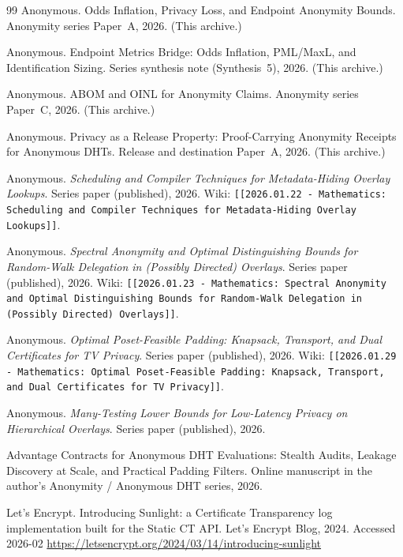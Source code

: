 \documentclass[11pt]{article}
\begin{document}
\begin{thebibliography}{99}
Anonymous.
\newblock Odds Inflation, Privacy Loss, and Endpoint Anonymity Bounds.
\newblock Anonymity series Paper~A, 2026. (This archive.)

Anonymous.
\newblock Endpoint Metrics Bridge: Odds Inflation, PML/MaxL, and Identification Sizing.
\newblock Series synthesis note (Synthesis~5), 2026. (This archive.)

Anonymous.
\newblock ABOM and OINL for Anonymity Claims.
\newblock Anonymity series Paper~C, 2026. (This archive.)

Anonymous.
\newblock Privacy as a Release Property: Proof-Carrying Anonymity Receipts for Anonymous DHTs.
\newblock Release and destination Paper~A, 2026. (This archive.)

Anonymous.
\newblock \emph{Scheduling and Compiler Techniques for Metadata-Hiding Overlay Lookups}.
\newblock Series paper (published), 2026.
\newblock Wiki: \texttt{[[2026.01.22 - Mathematics: Scheduling and Compiler Techniques for Metadata-Hiding Overlay Lookups]]}.

Anonymous.
\newblock \emph{Spectral Anonymity and Optimal Distinguishing Bounds for Random-Walk Delegation in (Possibly Directed) Overlays}.
\newblock Series paper (published), 2026.
\newblock Wiki: \texttt{[[2026.01.23 - Mathematics: Spectral Anonymity and Optimal Distinguishing Bounds for Random-Walk Delegation in (Possibly Directed) Overlays]]}.

Anonymous.
\newblock \emph{Optimal Poset-Feasible Padding: Knapsack, Transport, and Dual Certificates for TV Privacy}.
\newblock Series paper (published), 2026.
\newblock Wiki: \texttt{[[2026.01.29 - Mathematics: Optimal Poset-Feasible Padding: Knapsack, Transport, and Dual Certificates for TV Privacy]]}.

Anonymous.
\newblock \emph{Many-Testing Lower Bounds for Low-Latency Privacy on Hierarchical Overlays}.
\newblock Series paper (published), 2026.

\newblock Advantage Contracts for Anonymous DHT Evaluations: Stealth Audits, Leakage Discovery at Scale, and Practical Padding Filters.
\newblock Online manuscript in the author's Anonymity / Anonymous DHT series, 2026.

{Let's Encrypt}.
\newblock Introducing Sunlight: a Certificate Transparency log implementation built for the Static CT API.
\newblock Let's Encrypt Blog, 2024.
\newblock Accessed 2026-02
\newblock \url{https://letsencrypt.org/2024/03/14/introducing-sunlight}


\end{thebibliography}
\end{document}
